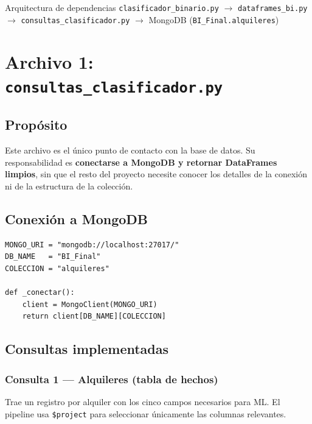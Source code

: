 \documentclass[12pt,a4paper]{article}
\begin{document}
\begin{cajainfo}{Arquitectura de dependencias}
\centering
\texttt{clasificador\_binario.py}
$\longrightarrow$ \texttt{dataframes\_bi.py}
$\longrightarrow$ \texttt{consultas\_clasificador.py}
$\longrightarrow$ MongoDB (\texttt{BI\_Final.alquileres})
\end{cajainfo}

\section{Archivo 1: \texttt{consultas\_clasificador.py}}

\subsection{Prop\'osito}

Este archivo es el \'unico punto de contacto con la base de datos.
Su responsabilidad es \textbf{conectarse a MongoDB y retornar DataFrames
limpios}, sin que el resto del proyecto necesite conocer los detalles
de la conexi\'on ni de la estructura de la colecci\'on.

\subsection{Conexi\'on a MongoDB}

\begin{lstlisting}[caption={Par\'ametros de conexi\'on}]
MONGO_URI = "mongodb://localhost:27017/"
DB_NAME   = "BI_Final"
COLECCION = "alquileres"

def _conectar():
    client = MongoClient(MONGO_URI)
    return client[DB_NAME][COLECCION]
\end{lstlisting}

\subsection{Consultas implementadas}

\subsubsection{Consulta 1 --- Alquileres (tabla de hechos)}

Trae un registro por alquiler con los cinco campos necesarios para ML.
El pipeline usa \texttt{\$project} para seleccionar \'unicamente las
columnas relevantes.
\end{document}

